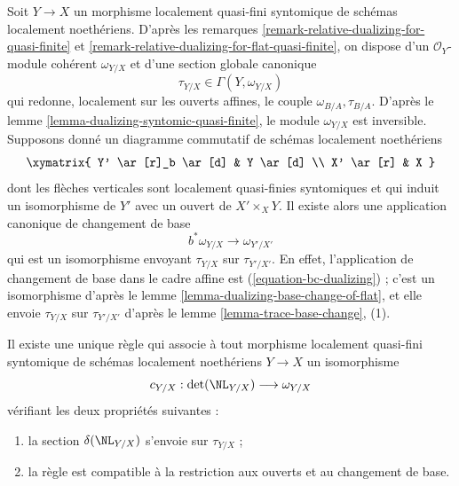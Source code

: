 \noindent
Soit $Y \to X$ un morphisme localement quasi-fini syntomique de
schémas localement noethériens. D'après les
remarques \ref{remark-relative-dualizing-for-quasi-finite} et
\ref{remark-relative-dualizing-for-flat-quasi-finite}, on dispose
d'un $\mathcal{O}_Y$-module cohérent $\omega_{Y/X}$ et d'une section globale
canonique
$$
\tau_{Y/X} \in \Gamma(Y, \omega_{Y/X})
$$
qui redonne, localement sur les ouverts affines, le couple $\omega_{B/A}, \tau_{B/A}$.
D'après le lemme \ref{lemma-dualizing-syntomic-quasi-finite}, le module
$\omega_{Y/X}$ est inversible. Supposons donné un diagramme commutatif de
schémas localement noethériens
$$
\xymatrix{
Y' \ar[r]_b \ar[d] & Y \ar[d] \\
X' \ar[r] & X
}
$$
dont les flèches verticales sont localement quasi-finies syntomiques et qui
induit un isomorphisme de $Y'$ avec un ouvert de $X' \times_X Y$.
Il existe alors une application canonique de changement de base
$$
b^*\omega_{Y/X} \longrightarrow \omega_{Y'/X'}
$$
qui est un isomorphisme
envoyant $\tau_{Y/X}$ sur $\tau_{Y'/X'}$. En effet, l'application de changement de base
dans le cadre affine est (\ref{equation-bc-dualizing}) ; c'est un
isomorphisme d'après le lemme \ref{lemma-dualizing-base-change-of-flat}, et elle
envoie $\tau_{Y/X}$ sur $\tau_{Y'/X'}$ d'après le
lemme \ref{lemma-trace-base-change}, (1).

\begin{proposition}
\label{proposition-tate-map}
Il existe une unique règle qui associe à tout morphisme localement quasi-fini syntomique
de schémas localement noethériens $Y \to X$ un isomorphisme
$$
c_{Y/X} : \det(\NL_{Y/X}) \longrightarrow \omega_{Y/X}
$$
vérifiant les deux propriétés suivantes :
\begin{enumerate}
\item la section $\delta(\NL_{Y/X})$ s'envoie sur $\tau_{Y/X}$ ;
\item la règle est compatible à la restriction aux ouverts et au
changement de base.
\end{enumerate}
\end{proposition}

